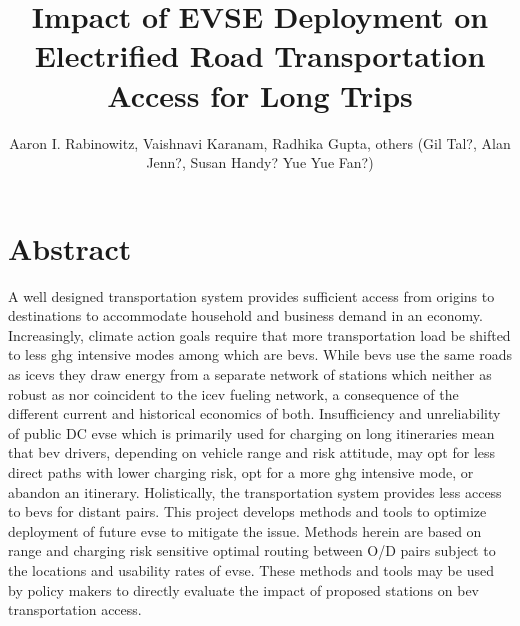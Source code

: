 \documentclass[11pt]{article}
\title{Impact of EVSE Deployment on Electrified Road Transportation Access for Long Trips}
\author{Aaron I. Rabinowitz, Vaishnavi Karanam, Radhika Gupta, others (Gil Tal?, Alan Jenn?, Susan Handy? Yue Yue Fan?)}
\date{}
\begin{document}
\maketitle

\section*{Abstract}

A well designed transportation system provides sufficient access from origins to destinations to accommodate household and business demand in an economy.  Increasingly, climate action goals require that more transportation load be shifted to less \gls{ghg} intensive modes among which are \glspl{bev}. While \glspl{bev} use the same roads as \glspl{icev} they draw energy from a separate network of stations which neither as robust as nor coincident to the \gls{icev} fueling network, a consequence of the different current and historical economics of both. Insufficiency and unreliability of public DC \gls{evse} which is primarily used for charging on long itineraries mean that \gls{bev} drivers, depending on vehicle range and risk attitude, may opt for less direct paths with lower charging risk, opt for a more \gls{ghg} intensive mode, or abandon an itinerary. Holistically, the transportation system provides less access to \glspl{bev} for distant pairs. This project develops methods and tools to optimize deployment of future \gls{evse} to mitigate the issue. Methods herein are based on range and charging risk sensitive optimal routing between O/D pairs subject to the locations and usability rates of \gls{evse}. These methods and tools may be used by policy makers to directly evaluate the impact of proposed stations on \gls{bev} transportation access.
\medskip
\end{document}
